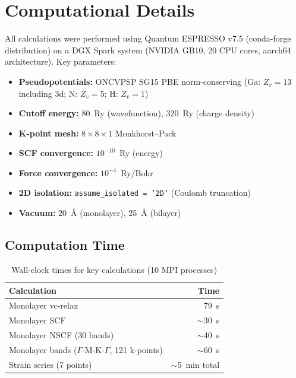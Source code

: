 \documentclass[11pt]{article}
\begin{document}
\section{Computational Details}

All calculations were performed using Quantum ESPRESSO v7.5 (conda-forge distribution) on a DGX Spark system (NVIDIA GB10, 20 CPU cores, aarch64 architecture). Key parameters:

\begin{itemize}
    \item \textbf{Pseudopotentials:} ONCVPSP SG15 PBE norm-conserving (Ga: $Z_v = 13$ including 3d; N: $Z_v = 5$; H: $Z_v = 1$)
    \item \textbf{Cutoff energy:} 80~Ry (wavefunction), 320~Ry (charge density)
    \item \textbf{K-point mesh:} $8 \times 8 \times 1$ Monkhorst--Pack
    \item \textbf{SCF convergence:} $10^{-10}$~Ry (energy)
    \item \textbf{Force convergence:} $10^{-4}$~Ry/Bohr
    \item \textbf{2D isolation:} \texttt{assume\_isolated = '2D'} (Coulomb truncation)
    \item \textbf{Vacuum:} 20~\AA{} (monolayer), 25~\AA{} (bilayer)
\end{itemize}

\subsection{Computation Time}

\begin{table}[H]
\centering
\caption{Wall-clock times for key calculations (10 MPI processes)}
\label{tab:timing}
\begin{tabular}{@{}lr@{}}
\toprule
\textbf{Calculation} & \textbf{Time} \\
\midrule
Monolayer vc-relax & 79~s \\
Monolayer SCF & $\sim$30~s \\
Monolayer NSCF (30 bands) & $\sim$40~s \\
Monolayer bands ($\Gamma$-M-K-$\Gamma$, 121 k-points) & $\sim$60~s \\
Strain series (7 points) & $\sim$5~min total \\
\bottomrule
\end{tabular}
\end{table}
\end{document}

